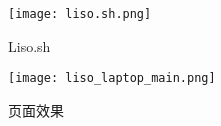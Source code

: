 \begin{figure}[htbp!]
    \begin{center}
        \texttt{[image: liso.sh.png]}
        \caption{Liso.sh}\label{fig:Liso.sh}
    \end{center}
\end{figure}



\begin{figure}[htbp!]
    \begin{center}
        \texttt{[image: liso\_laptop\_main.png]}
        \caption{页面效果}\label{fig:lap}
    \end{center}
\end{figure}

